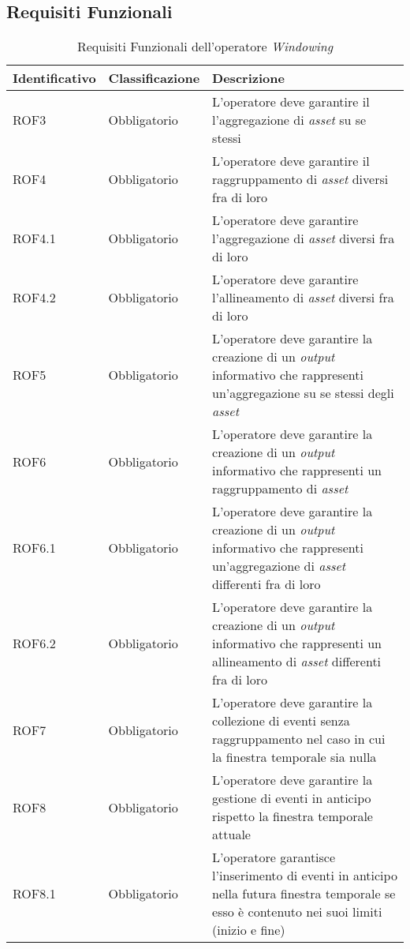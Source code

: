 \subsection{Requisiti Funzionali}
{
\centering
\begin{longtable}{L{3cm} L{3cm} L{7.5cm}}
\caption{Requisiti Funzionali dell'operatore \textit{Windowing}}\\
\textbf{Identificativo} &
\textbf{Classificazione}&
\textbf{Descrizione}\\
\endhead
\hline

ROF3 & Obbligatorio & L'operatore deve garantire il l'aggregazione di \textit{asset} su se stessi\\
\hline
ROF4 & Obbligatorio & L'operatore deve garantire il raggruppamento di \textit{asset} diversi fra di loro\\
\hline
ROF4.1 & Obbligatorio & L'operatore deve garantire l'aggregazione di \textit{asset} diversi fra di loro\\
\hline
ROF4.2 & Obbligatorio & L'operatore deve garantire l'allineamento di \textit{asset} diversi fra di loro\\
\hline
ROF5 & Obbligatorio & L'operatore deve garantire la creazione di un \textit{output} informativo che rappresenti un'aggregazione su se stessi degli \textit{asset}\\
\hline
ROF6 & Obbligatorio & L'operatore deve garantire la creazione di un \textit{output} informativo che rappresenti un raggruppamento di \textit{asset}\\
\hline
ROF6.1 & Obbligatorio & L'operatore deve garantire la creazione di un \textit{output} informativo che rappresenti un'aggregazione di \textit{asset} differenti fra di loro\\
\hline
ROF6.2 & Obbligatorio & L'operatore deve garantire la creazione di un \textit{output} informativo che rappresenti un allineamento di \textit{asset} differenti fra di loro\\
\hline
ROF7 & Obbligatorio & L'operatore deve garantire la collezione di eventi senza raggruppamento nel caso in cui la finestra temporale sia nulla\\
\hline
ROF8 & Obbligatorio & L'operatore deve garantire la gestione di eventi in anticipo rispetto la finestra temporale attuale\\
\hline
ROF8.1 & Obbligatorio & L'operatore garantisce l'inserimento di eventi in anticipo nella futura finestra temporale se esso è contenuto nei suoi limiti (inizio e fine)\\
\hline

\end{longtable}}
